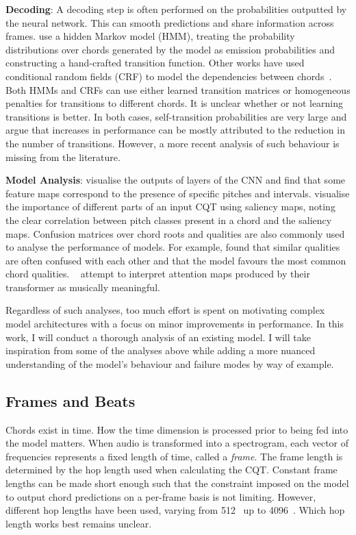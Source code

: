 \textbf{Decoding}: A decoding step is often performed on the probabilities outputted by the neural network. This can smooth predictions and share information across frames. \citet{BalanceRandomForestACR} use a hidden Markov model (HMM), treating the probability distributions over chords generated by the model as emission probabilities and constructing a hand-crafted transition function. Other works have used conditional random fields (CRF) to model the dependencies between chords~\citep{ACRLargeVocab1}. Both HMMs and CRFs can use either learned transition matrices or homogeneous penalties for transitions to different chords. It is unclear whether or not learning transitions is better. In both cases, self-transition probabilities are very large and \citet{CommonVariations} argue that increases in performance can be mostly attributed to the reduction in the number of transitions. However, a more recent analysis of such behaviour is missing from the literature.

\textbf{Model Analysis}: \citet{FeatureMaps} visualise the outputs of layers of the CNN and find that some feature maps correspond to the presence of specific pitches and intervals. \citet{SaliencyChroma} visualise the importance of different parts of an input CQT using saliency maps, noting the clear correlation between pitch classes present in a chord and the saliency maps. Confusion matrices over chord roots and qualities are also commonly used to analyse the performance of models. For example, \citet{StructuredTraining} found that similar qualities are often confused with each other and that the model favours the most common chord qualities. ~\citet{BTC} attempt to interpret attention maps produced by their transformer as musically meaningful.

Regardless of such analyses, too much effort is spent on motivating complex model architectures with a focus on minor improvements in performance. In this work, I will conduct a thorough analysis of an existing model. I will take inspiration from some of the analyses above while adding a more nuanced understanding of the model's behaviour and failure modes by way of example.

\subsection{Frames and Beats}

Chords exist in time. How the time dimension is processed prior to being fed into the model matters. When audio is transformed into a spectrogram, each vector of frequencies represents a fixed length of time, called a \emph{frame}. The frame length is determined by the hop length used when calculating the CQT. Constant frame lengths can be made short enough such that the constraint imposed on the model to output chord predictions on a per-frame basis is not limiting. However, different hop lengths have been used, varying from 512~\cite{ACRLargeVocab1} up to 4096~\citep{StructuredTraining}. Which hop length works best remains unclear.

